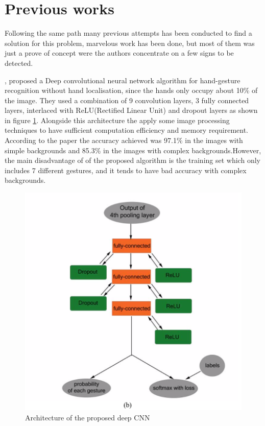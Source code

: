 \documentclass[12pt]{report}
\begin{document}
\section{Previous works}
Following the same path many previous attempts has been conducted 
to find a solution for this problem, marvelous work has been done, 
but most of them was just a prove of concept were the authors concentrate 
on a few signs to be detected.


\cite{Bao2017}, proposed a Deep convolutional neural network algorithm for hand-gesture 
recognition without hand localisation, since the hands only occupy about 10\% of 
the image. They used a combination of 9 convolution layers, 3 fully connected layers, 
interlaced with ReLU(Rectified Linear Unit) and dropout layers as shown in 
figure \ref{fig:tiny_architecture}. Alongside this architecture the apply some image 
processing techniques to have sufficient computation efficiency and memory requirement.
According to the paper the accuracy achieved was 97.1\% in the images with simple backgrounds
and 85.3\% in the images with complex backgrounds.However, the main disadvantage of of 
the proposed algorithm is the training set which only includes 7 different gestures,
and it tends to have bad accuracy with complex backgrounds.
\bigbreak

\begin{figure}[h]
    \centering
    \includegraphics[width=.8\textwidth]{./images/tiny_b.png}
    \caption{Architecture of the proposed deep CNN }\label{fig:tiny_architecture}
\end{figure}
\end{document}
